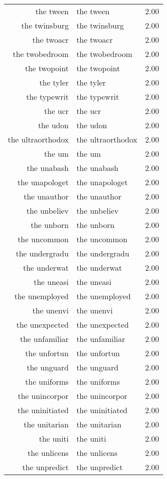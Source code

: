 \begin{table}[ht]
\begin{tabular}{rlr}
  the tween & the tween & 2.00 \\ 
  the twinsburg & the twinsburg & 2.00 \\ 
  the twoacr & the twoacr & 2.00 \\ 
  the twobedroom & the twobedroom & 2.00 \\ 
  the twopoint & the twopoint & 2.00 \\ 
  the tyler & the tyler & 2.00 \\ 
  the typewrit & the typewrit & 2.00 \\ 
  the ucr & the ucr & 2.00 \\ 
  the udon & the udon & 2.00 \\ 
  the ultraorthodox & the ultraorthodox & 2.00 \\ 
  the um & the um & 2.00 \\ 
  the unabash & the unabash & 2.00 \\ 
  the unapologet & the unapologet & 2.00 \\ 
  the unauthor & the unauthor & 2.00 \\ 
  the unbeliev & the unbeliev & 2.00 \\ 
  the unborn & the unborn & 2.00 \\ 
  the uncommon & the uncommon & 2.00 \\ 
  the undergradu & the undergradu & 2.00 \\ 
  the underwat & the underwat & 2.00 \\ 
  the uneasi & the uneasi & 2.00 \\ 
  the unemployed & the unemployed & 2.00 \\ 
  the unenvi & the unenvi & 2.00 \\ 
  the unexpected & the unexpected & 2.00 \\ 
  the unfamiliar & the unfamiliar & 2.00 \\ 
  the unfortun & the unfortun & 2.00 \\ 
  the unguard & the unguard & 2.00 \\ 
  the uniforms & the uniforms & 2.00 \\ 
  the unincorpor & the unincorpor & 2.00 \\ 
  the uninitiated & the uninitiated & 2.00 \\ 
  the unitarian & the unitarian & 2.00 \\ 
  the uniti & the uniti & 2.00 \\ 
  the unlicens & the unlicens & 2.00 \\ 
  the unpredict & the unpredict & 2.00 \\ 

\end{tabular}
\end{table}
